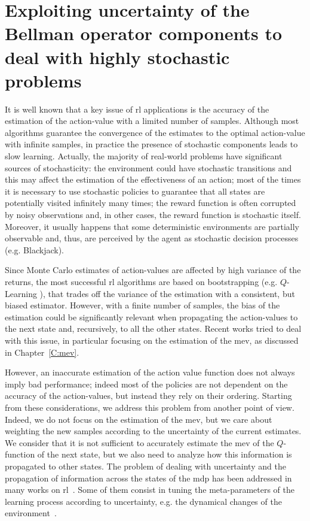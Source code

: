 \chapter{Exploiting uncertainty of the Bellman operator components to deal with highly stochastic problems}\label{C:rq}
It is well known that a key issue of \gls{rl} applications is the accuracy of the estimation of the action-value with a limited number of samples. Although most algorithms guarantee the convergence of the estimates to the optimal action-value with infinite samples, in practice the presence of stochastic components leads to slow learning. Actually, the majority of real-world problems have significant sources of stochasticity: the environment could have stochastic transitions and this may affect the estimation of the effectiveness of an action; most of the times it is necessary to use stochastic policies to guarantee that all states are potentially visited infinitely many times; the reward function is often corrupted by noisy observations and, in other cases, the reward function is stochastic itself. Moreover, it usually happens that some deterministic environments are partially observable and, thus, are perceived by the agent as stochastic decision processes (e.g. Blackjack).

Since Monte Carlo estimates of action-values are affected by high variance of the returns, the most successful \gls{rl} algorithms are based on bootstrapping (e.g. $Q$-Learning \cite{watkins1989learning}), that trades off the variance of the estimation with a consistent, but biased estimator. However, with a finite number of samples, the bias of the estimation could be significantly relevant when propagating the action-values to the next state and, recursively, to all the other states. Recent works tried to deal with this issue, in particular focusing on the estimation of the \gls{mev}, as discussed in Chapter~\ref{C:mev}. 

However, an inaccurate estimation of the action value function does not always imply bad performance; indeed most of the policies are not dependent on the accuracy of the action-values, but instead they rely on their ordering. Starting from these considerations, we address this problem from another point of view. Indeed, we do not focus on the estimation of the \gls{mev}, but we care about weighting the new samples according to the uncertainty of the current estimates. 
We consider that it is not sufficient to accurately estimate the \gls{mev} of the $Q$-function of the next state, but we also need to analyze how this information is propagated to other states. The problem of dealing with uncertainty and the propagation of information across the states of the \gls{mdp} has been addressed in many works on \gls{rl}~\cite{mohagheghi2007proportional, Tewari2007}. Some of them consist in tuning the meta-parameters of the learning process according to uncertainty, e.g. the dynamical changes of the environment~\cite{schweighofer2003meta, Kobayashi2009, yoshida2013reinforcement}.

